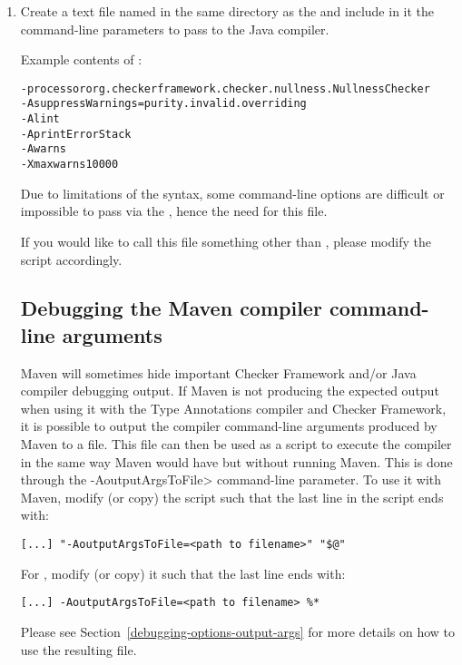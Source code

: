 \begin{enumerate}
\item Create a text file named  in the same directory as the 
and include in it the command-line parameters to pass to the Java compiler.

Example contents of :

\begin{alltt}
-processor org.checkerframework.checker.nullness.NullnessChecker
-AsuppressWarnings=purity.invalid.overriding
-Alint
-AprintErrorStack
-Awarns
-Xmaxwarns 10000
\end{alltt}

Due to limitations of the  syntax, some command-line options are
difficult or impossible to pass via the , hence the need for this file.

If you would like to call this file something other than ,
please modify the  script accordingly.

\subsection{Debugging the Maven compiler command-line arguments\label{debugging-maven-args}}

Maven will sometimes hide important Checker Framework and/or Java compiler debugging output.
If Maven is not producing the expected output when using it with the Type Annotations compiler
and Checker Framework, it is possible to output the compiler command-line arguments produced
by Maven to a file.  This file can then be used as a script to execute the compiler in the
same way Maven would have but without running Maven.  This is done through the
\<-AoutputArgsToFile> command-line parameter.  To use it with Maven, modify (or copy) the
 script such that the last line in the script ends with:

\begin{verbatim}
[...] "-AoutputArgsToFile=<path to filename>" "$@"
\end{verbatim}

For , modify (or copy) it such that the last line ends with:

\begin{verbatim}
[...] -AoutputArgsToFile=<path to filename> %*
\end{verbatim}

Please see Section~\ref{debugging-options-output-args} for more details on how to use
the resulting file.

\end{enumerate}

